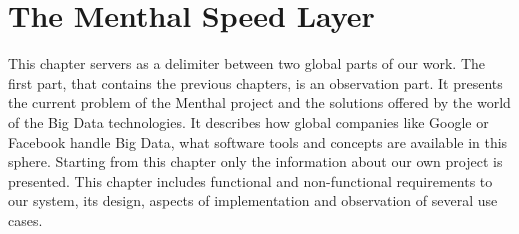 \chapter{The Menthal Speed Layer}
\label{chap:menthal_backend_architecture}

This chapter servers as a delimiter between two global parts of our work.
The first part, that contains the previous chapters, is an observation part.
It presents the current problem of the Menthal project and the solutions offered by the world of the Big Data technologies.
It describes how global companies like Google or Facebook handle Big Data, what software tools and concepts are available in this sphere. 
Starting from this chapter only the information about our own project is presented.
This chapter includes functional and non-functional requirements to our system, its design, aspects of implementation and observation of several use cases.










